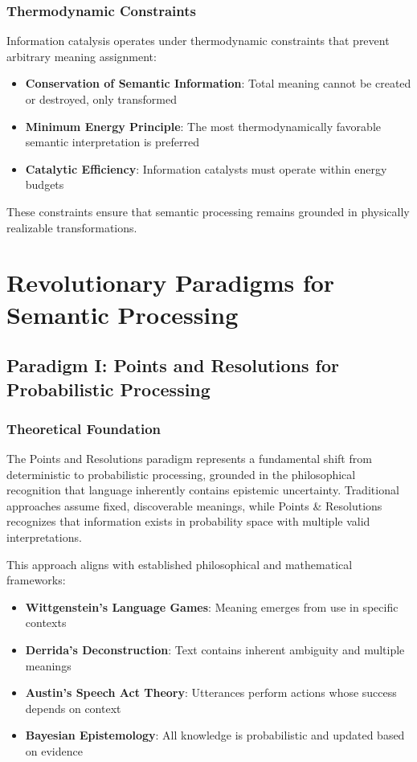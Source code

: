 \documentclass[12pt,a4paper,twoside]{article}
\begin{document}
\subsubsection{Thermodynamic Constraints}

Information catalysis operates under thermodynamic constraints that prevent arbitrary meaning assignment:

\begin{itemize}
\item \textbf{Conservation of Semantic Information}: Total meaning cannot be created or destroyed, only transformed
\item \textbf{Minimum Energy Principle}: The most thermodynamically favorable semantic interpretation is preferred
\item \textbf{Catalytic Efficiency}: Information catalysts must operate within energy budgets
\end{itemize}

These constraints ensure that semantic processing remains grounded in physically realizable transformations.

\section{Revolutionary Paradigms for Semantic Processing}

\subsection{Paradigm I: Points and Resolutions for Probabilistic Processing}

\subsubsection{Theoretical Foundation}

The Points and Resolutions paradigm represents a fundamental shift from deterministic to probabilistic processing, grounded in the philosophical recognition that language inherently contains epistemic uncertainty. Traditional approaches assume fixed, discoverable meanings, while Points \& Resolutions recognizes that information exists in probability space with multiple valid interpretations.

This approach aligns with established philosophical and mathematical frameworks:
\begin{itemize}
\item \textbf{Wittgenstein's Language Games}: Meaning emerges from use in specific contexts
\item \textbf{Derrida's Deconstruction}: Text contains inherent ambiguity and multiple meanings
\item \textbf{Austin's Speech Act Theory}: Utterances perform actions whose success depends on context
\item \textbf{Bayesian Epistemology}: All knowledge is probabilistic and updated based on evidence
\end{itemize}
\end{document}
